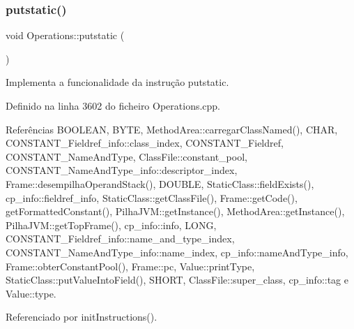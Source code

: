 \subsubsection{\texorpdfstring{putstatic()}{putstatic()}}
{\footnotesize\ttfamily void Operations\+::putstatic (\begin{DoxyParamCaption}{ }\end{DoxyParamCaption})\hspace{0.3cm}{\ttfamily [private]}}



Implementa a funcionalidade da instrução putstatic. 



Definido na linha 3602 do ficheiro Operations.\+cpp.



Referências B\+O\+O\+L\+E\+AN, B\+Y\+TE, Method\+Area\+::carregar\+Class\+Named(), C\+H\+AR, C\+O\+N\+S\+T\+A\+N\+T\+\_\+\+Fieldref\+\_\+info\+::class\+\_\+index, C\+O\+N\+S\+T\+A\+N\+T\+\_\+\+Fieldref, C\+O\+N\+S\+T\+A\+N\+T\+\_\+\+Name\+And\+Type, Class\+File\+::constant\+\_\+pool, C\+O\+N\+S\+T\+A\+N\+T\+\_\+\+Name\+And\+Type\+\_\+info\+::descriptor\+\_\+index, Frame\+::desempilha\+Operand\+Stack(), D\+O\+U\+B\+LE, Static\+Class\+::field\+Exists(), cp\+\_\+info\+::fieldref\+\_\+info, Static\+Class\+::get\+Class\+File(), Frame\+::get\+Code(), get\+Formatted\+Constant(), Pilha\+J\+V\+M\+::get\+Instance(), Method\+Area\+::get\+Instance(), Pilha\+J\+V\+M\+::get\+Top\+Frame(), cp\+\_\+info\+::info, L\+O\+NG, C\+O\+N\+S\+T\+A\+N\+T\+\_\+\+Fieldref\+\_\+info\+::name\+\_\+and\+\_\+type\+\_\+index, C\+O\+N\+S\+T\+A\+N\+T\+\_\+\+Name\+And\+Type\+\_\+info\+::name\+\_\+index, cp\+\_\+info\+::name\+And\+Type\+\_\+info, Frame\+::obter\+Constant\+Pool(), Frame\+::pc, Value\+::print\+Type, Static\+Class\+::put\+Value\+Into\+Field(), S\+H\+O\+RT, Class\+File\+::super\+\_\+class, cp\+\_\+info\+::tag e Value\+::type.



Referenciado por init\+Instructions().

